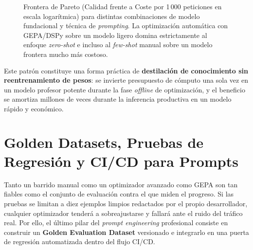 \begin{figure}[htbp]
\caption{Frontera de Pareto (Calidad frente a Coste por 1\,000 peticiones en escala logarítmica) para distintas combinaciones de modelo fundacional y técnica de \textit{prompting}. La optimización automática con GEPA/DSPy sobre un modelo ligero domina estrictamente al enfoque \textit{zero-shot} e incluso al \textit{few-shot} manual sobre un modelo frontera mucho más costoso.}
\label{fig:pareto-prompt-opt}
\end{figure}

Este patrón constituye una forma práctica de \textbf{destilación de conocimiento sin reentrenamiento de pesos}: se invierte presupuesto de cómputo una sola vez en un modelo profesor potente durante la fase \textit{offline} de optimización, y el beneficio se amortiza millones de veces durante la inferencia productiva en un modelo rápido y económico.

\section[Golden Datasets y CI/CD para Prompts]{Golden Datasets, Pruebas de Regresión y CI/CD para Prompts}\label{sec:golden-datasets-cicd}

Tanto un barrido manual como un optimizador avanzado como GEPA son tan fiables como el conjunto de evaluación contra el que miden el progreso. Si las pruebas se limitan a diez ejemplos limpios redactados por el propio desarrollador, cualquier optimizador tenderá a sobreajustarse y fallará ante el ruido del tráfico real. Por ello, el último pilar del \textit{prompt engineering} profesional consiste en construir un \textbf{Golden Evaluation Dataset} versionado e integrarlo en una puerta de regresión automatizada dentro del flujo CI/CD.

